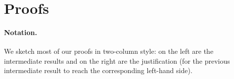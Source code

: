 \section{Proofs}

\paragraph{Notation.} We sketch most of our proofs in two-column style: on the
left are the intermediate results and on the right are the justification (for
the previous intermediate result to reach the corresponding left-hand side).








